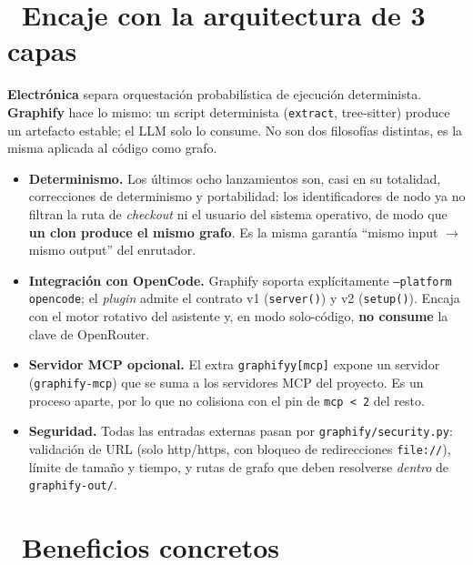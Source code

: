 \documentclass[11pt,a4paper]{article}
\newcommand{\iconotexto}[2]{\textcolor{cyanNeon}{\faIcon{#1}}~#2}
\begin{document}
\section[Encaje con ELECTRONICA]{\iconotexto{balance-scale}{Encaje con la arquitectura de 3 capas}}

\begin{tcolorbox}[tarjetaIcono, title={\faIcon{check-circle}~Principio rector compartido}]
\textbf{Electrónica} separa orquestación probabilística de ejecución determinista.
\textbf{Graphify} hace lo mismo: un script determinista (\texttt{extract}, tree-sitter)
produce un artefacto estable; el LLM solo lo consume. No son dos filosofías distintas,
es la misma aplicada al código como grafo.
\end{tcolorbox}

\begin{itemize}[leftmargin=1.4em]
    \item \textbf{Determinismo.} Los últimos ocho lanzamientos son, casi en su totalidad,
    correcciones de determinismo y portabilidad: los identificadores de nodo ya no
    filtran la ruta de \emph{checkout} ni el usuario del sistema operativo, de modo que
    \textbf{un clon produce el mismo grafo}. Es la misma garantía ``mismo input
    \(\rightarrow\) mismo output'' del enrutador.
    \item \textbf{Integración con OpenCode.} Graphify soporta explícitamente
    \texttt{--platform opencode}; el \emph{plugin} admite el contrato v1 (\texttt{server()})
    y v2 (\texttt{setup()}). Encaja con el motor rotativo del asistente y, en modo
    solo-código, \textbf{no consume} la clave de OpenRouter.
    \item \textbf{Servidor MCP opcional.} El extra \texttt{graphifyy[mcp]} expone un
    servidor (\texttt{graphify-mcp}) que se suma a los servidores MCP del proyecto. Es un
    proceso aparte, por lo que no colisiona con el pin de \texttt{mcp\,<\,2} del resto.
    \item \textbf{Seguridad.} Todas las entradas externas pasan por
    \texttt{graphify/security.py}: validación de URL (solo http/https, con bloqueo de
    redirecciones \texttt{file://}), límite de tamaño y tiempo, y rutas de grafo que deben
    resolverse \emph{dentro} de \texttt{graphify-out/}.
\end{itemize}

\section[Beneficios]{\iconotexto{chart-line}{Beneficios concretos}}
\end{document}
